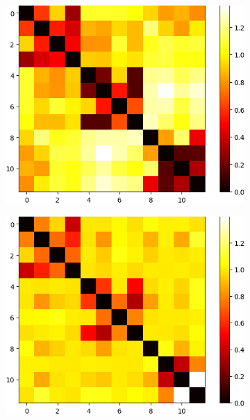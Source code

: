 \begin{figure}
    \centering
    \begin{subfigure}{0.48\textwidth}
        \includegraphics[width=\linewidth]{figures/syntetic_data/distance_matrix/SO3_3_signature_3.png}
        \caption{}
        \label{fig:classification-signature-level3-SO3-3}
    \end{subfigure}
    \hfill
    \begin{subfigure}{0.48\textwidth}
        \includegraphics[width=\linewidth]{figures/syntetic_data/distance_matrix/SO3_3_signature_5.png}

\end{subfigure}
\end{figure}
